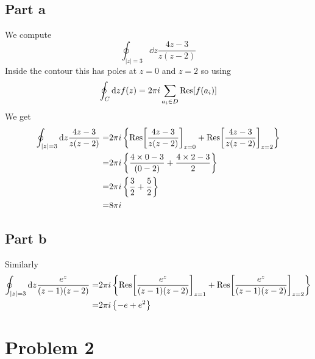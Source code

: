 \documentclass[a4paper,12pt]{article}
\begin{document}
\subsection*{Part a}
We compute
\begin{equation}
\oint_{|z|=3} \dd z\frac{4z-3}{z(z-2)}
\end{equation}
Inside the contour this has poles at $z=0$ and $z=2$ so using 
\begin{equation}
	\oint _C \dd z  f(z)=2\pi i \sum_{a_i\in D}\Res[f(a_i)]
\end{equation}
We get
\begin{equation}
\begin{aligned}
	\oint_{|z|=3} \dd z\frac{4z-3}{z(z-2)}=&2\pi i \left\{\Res[\frac{4z-3}{z(z-2)}]_{z=0}+\Res[\frac{4z-3}{z(z-2)}]_{z=2}\right\}\\
	=&2\pi i \left\{\frac{4\times 0-3}{(0-2)}+\frac{4\times 2-3}{2}\right\}\\
	=&2\pi i \left\{\frac{3}{2}+\frac{5}{2}\right\}\\	
	=&8\pi i 
\end{aligned}
\end{equation}
\subsection*{Part b}
Similarly
\begin{equation}
	\begin{aligned}
		\oint_{|z|=3} \dd z\frac{e^z}{(z-1)(z-2)}=&2\pi i \left\{\Res[\frac{e^z}{(z-1)(z-2)}]_{z=1}+\Res[\frac{e^z}{(z-1)(z-2)}]_{z=2}\right\}\\
		=&2\pi i \left\{-e+e^2\right\}\\
	\end{aligned}
\end{equation}
\section*{Problem 2}
\end{document}
